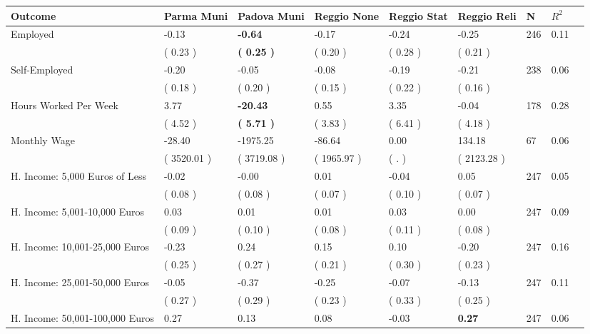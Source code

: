 \begin{tabular}{L{6.2cm} C{1.8cm} C{1.8cm} C{1.8cm} C{1.8cm} C{1.8cm} C{1.8cm} C{0.3cm} C{0.3cm}}
\toprule
 \textbf{Outcome} & \textbf{Parma Muni} & \textbf{Padova Muni} & \textbf{Reggio None} & \textbf{Reggio Stat} & \textbf{Reggio Reli} & \textbf{N} & \textbf{$ R^2$} \\
\midrule
Employed &     -0.13 & \textbf{    -0.64} &     -0.17 &     -0.24 &     -0.25  & 246 &       0.11 \\ 
 & (     0.23 ) & \textbf{(     0.25 )} & (     0.20 ) & (     0.28 ) & (     0.21 )  & \\
Self-Employed &     -0.20 &     -0.05 &     -0.08 &     -0.19 &     -0.21  & 238 &       0.06 \\ 
 & (     0.18 ) & (     0.20 ) & (     0.15 ) & (     0.22 ) & (     0.16 )  & \\
Hours Worked Per Week &      3.77 & \textbf{   -20.43} &      0.55 &      3.35 &     -0.04  & 178 &       0.28 \\ 
 & (     4.52 ) & \textbf{(     5.71 )} & (     3.83 ) & (     6.41 ) & (     4.18 )  & \\
Monthly Wage &    -28.40 &  -1975.25 &    -86.64 &      0.00 &    134.18  & 67 &       0.06 \\ 
 & (  3520.01 ) & (  3719.08 ) & (  1965.97 ) & (        . ) & (  2123.28 )  & \\
H. Income: 5,000 Euros of Less &     -0.02 &     -0.00 &      0.01 &     -0.04 &      0.05  & 247 &       0.05 \\ 
 & (     0.08 ) & (     0.08 ) & (     0.07 ) & (     0.10 ) & (     0.07 )  & \\
H. Income: 5,001-10,000 Euros &      0.03 &      0.01 &      0.01 &      0.03 &      0.00  & 247 &       0.09 \\ 
 & (     0.09 ) & (     0.10 ) & (     0.08 ) & (     0.11 ) & (     0.08 )  & \\
H. Income: 10,001-25,000 Euros &     -0.23 &      0.24 &      0.15 &      0.10 &     -0.20  & 247 &       0.16 \\ 
 & (     0.25 ) & (     0.27 ) & (     0.21 ) & (     0.30 ) & (     0.23 )  & \\
H. Income: 25,001-50,000 Euros &     -0.05 &     -0.37 &     -0.25 &     -0.07 &     -0.13  & 247 &       0.11 \\ 
 & (     0.27 ) & (     0.29 ) & (     0.23 ) & (     0.33 ) & (     0.25 )  & \\
H. Income: 50,001-100,000 Euros &      0.27 &      0.13 &      0.08 &     -0.03 & \textbf{     0.27}  & 247 &       0.06 \\ 

\end{tabular}
